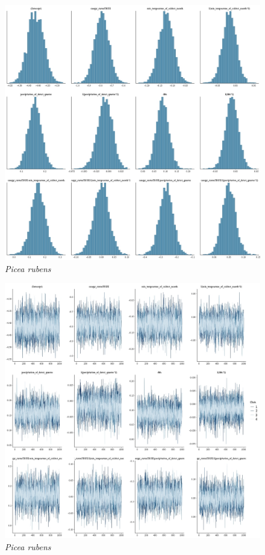\documentclass[letterpaper, 12pt]{article}
\begin{document}
\begin{figure}
	\centering
	\includegraphics[scale=0.4]{./18034-PIC-RUB_hist}
	\caption{\textit{Picea rubens}}
\end{figure}

\begin{figure}
	\centering
	\includegraphics[scale=0.4]{./18034-PIC-RUB_traces}
	\caption{\textit{Picea rubens}}
\end{figure}
\end{document}
